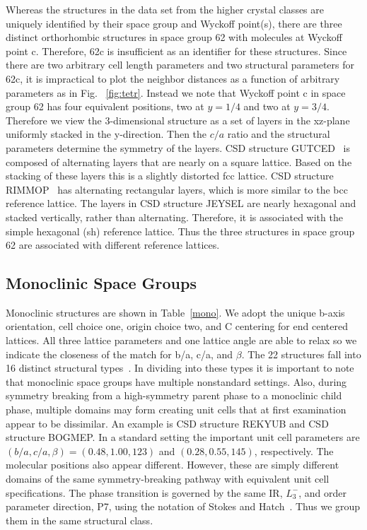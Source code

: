 \documentclass[preprint]{revtex4}              %
\begin{document}
Whereas the structures in the data set from the higher crystal
classes are uniquely identified by their space group and Wyckoff
point(s), there are three distinct orthorhombic structures in space
group 62 with molecules at Wyckoff point c.  Therefore, 62c is
insufficient as an identifier for these structures.  Since there are
two arbitrary cell length parameters and two structural parameters
for 62c, it is impractical to plot the neighbor distances as a
function of
arbitrary parameters as in Fig.\ %
\ref{fig:tetr}.  Instead we note that Wyckoff point c in space group
62 has four equivalent positions, two at $y=1/4$ and two at $y=3/4$.
Therefore we view the 3-dimensional structure as a set of layers in
the xz-plane uniformly stacked in the y-direction. Then the $c/a$
ratio and the structural parameters determine the symmetry of the
layers. CSD structure GUTCED~\cite{Dahl03} is composed of
alternating layers that are nearly on a square lattice. Based on the
stacking of these layers this is a slightly distorted fcc lattice.
CSD structure RIMMOP~\cite{Dahl03} has alternating rectangular
layers, which is more similar to the bcc reference lattice. The
layers in CSD structure JEYSEL are nearly hexagonal and stacked
vertically, rather than alternating. Therefore, it is associated
with the simple hexagonal (sh) reference lattice.  Thus the three
structures in space group 62 are associated with different reference
lattices.

\subsection{Monoclinic Space Groups}

Monoclinic structures are shown in Table~\ref{mono}. We adopt the
unique b-axis orientation, cell choice one, origin choice two, and C
centering for end centered lattices. All three lattice parameters
and one lattice angle are able to relax so we indicate the closeness
of the match for b/a, c/a, and $\beta$. The 22 structures fall into
16 distinct structural types~\cite{mcclurg}. In dividing into these types it is
important to note that monoclinic space groups have multiple
nonstandard settings. Also, during symmetry breaking from a
high-symmetry parent phase to a monoclinic child phase, multiple
domains may form creating unit cells that at first examination
appear to be dissimilar.  An example is CSD structure REKYUB and CSD
structure BOGMEP.  In a standard setting the important unit cell
parameters are $(b/a,c/a,\beta)=(0.48,1.00,123)$ and
$(0.28,0.55,145)$, respectively. The molecular positions also appear
different. However, these are simply different domains of the same
symmetry-breaking pathway with equivalent unit cell specifications.
The phase transition is governed by the same IR, $L_3^-$, and order
parameter direction, P7, using the notation of Stokes and
Hatch~\cite{Stokes02b}. Thus we group them in the same structural
class.
\end{document}
